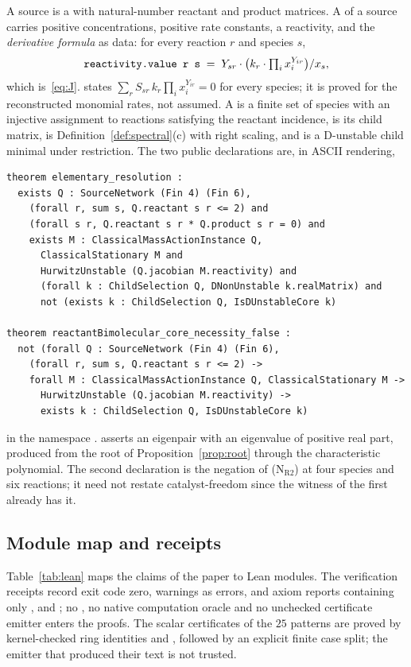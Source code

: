 \documentclass[11pt,a4paper]{article}
\theoremstyle{plain}
\theoremstyle{definition}
\theoremstyle{remark}
\newcommand{\Ract}{\mathrm{R2}}
\begin{document}
A source is a  with natural-number reactant and product matrices. A  of a source carries positive concentrations, positive rate constants, a reactivity, and the \emph{derivative formula} as data: for every reaction $r$ and species $s$,
\[
\text{\texttt{reactivity.value r s}} \;=\; Y_{sr}\cdot\bigl(k_r\cdot\textstyle\prod_ix_i^{Y_{ir}}\bigr)/x_s ,
\]
which is~\eqref{eq:J}.  states $\sum_rS_{sr}\,k_r\prod_ix_i^{Y_{ir}}=0$ for every species; it is proved for the reconstructed monomial rates, not assumed. A  is a finite set of species with an injective assignment to reactions satisfying the reactant incidence,  is its child matrix,  is Definition~\ref{def:spectral}(c) with right scaling, and  is a D-unstable child minimal under restriction. The two public declarations are, in ASCII rendering,
\begin{verbatim}
theorem elementary_resolution :
  exists Q : SourceNetwork (Fin 4) (Fin 6),
    (forall r, sum s, Q.reactant s r <= 2) and
    (forall s r, Q.reactant s r * Q.product s r = 0) and
    exists M : ClassicalMassActionInstance Q,
      ClassicalStationary M and
      HurwitzUnstable (Q.jacobian M.reactivity) and
      (forall k : ChildSelection Q, DNonUnstable k.realMatrix) and
      not (exists k : ChildSelection Q, IsDUnstableCore k)

theorem reactantBimolecular_core_necessity_false :
  not (forall Q : SourceNetwork (Fin 4) (Fin 6),
    (forall r, sum s, Q.reactant s r <= 2) ->
    forall M : ClassicalMassActionInstance Q, ClassicalStationary M ->
      HurwitzUnstable (Q.jacobian M.reactivity) ->
      exists k : ChildSelection Q, IsDUnstableCore k)
\end{verbatim}
in the namespace .  asserts an eigenpair with an eigenvalue of positive real part, produced from the root of Proposition~\ref{prop:root} through the characteristic polynomial. The second declaration is the negation of (N$_{\Ract}$) at four species and six reactions; it need not restate catalyst-freedom since the witness of the first already has it.

\subsection{Module map and receipts}

Table~\ref{tab:lean} maps the claims of the paper to Lean modules. The verification receipts record exit code zero, warnings as errors, and axiom reports containing only ,  and ; no , no native computation oracle and no unchecked certificate emitter enters the proofs. The scalar certificates of the $25$ patterns are proved by kernel-checked ring identities and , followed by an explicit finite case split; the emitter that produced their text is not trusted.
\end{document}

